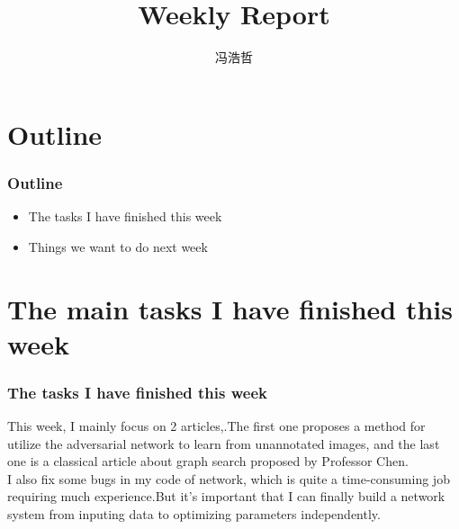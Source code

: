 \documentclass[8pt]{beamer}
\title{Weekly Report}
\author{冯浩哲}
\begin{document}
	\frame{\titlepage}
		
	
	\section*{Outline}	

\begin{frame}[fragile]
\frametitle{Outline}
\begin{itemize}  
	
\item The tasks I have finished this week
\vspace{.5cm} 
\item Things we want to do next week
\vspace{.5cm}
\end{itemize}
\end{frame}

\section*{The main tasks I have finished this week}	
\begin{frame}[fragile]
\frametitle{The tasks I have finished this week}
This week, I mainly focus on 2 articles\cite{zhang2017deep},\cite{li2006optimal}.The first one proposes a method for utilize the adversarial network to learn from unannotated images, and the last one is a classical article about graph search proposed by Professor Chen. \\
\vspace{.5cm}
I also fix some bugs in my code of network, which is quite a time-consuming job requiring much experience.But it's important that I can finally build a network system from inputing data to optimizing parameters independently.
\vspace{.3cm}
\end{frame}
\end{document}
